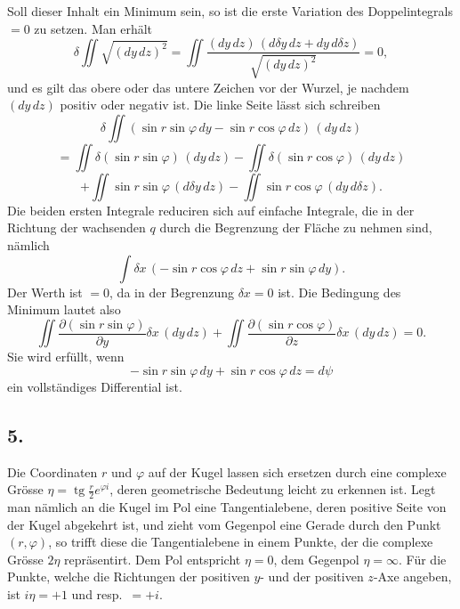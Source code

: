 \documentclass[12pt,a4paper]{article}
\DeclareMathOperator{\tg}{tg}
\begin{document}
Soll dieser Inhalt ein Minimum sein, so ist die erste Variation des Doppelintegrals $=0$ zu setzen. Man erh\"alt
\[\delta \iint \sqrt{(dy\, dz)^{2}} = \iint \frac{(dy\, dz)\, (d\delta y\, dz + dy\, d\delta z)}{\sqrt{(dy\, dz)^{2}}} = 0,\]
und es gilt das obere oder das untere Zeichen vor der Wurzel, je nachdem $(dy\, dz)$ positiv oder negativ ist. Die linke Seite l\"asst sich schreiben
\[\delta \iint (\sin r \sin\varphi\, dy - \sin r \cos\varphi\, dz)\, (dy\, dz)\]
\[= \iint \delta(\sin r \sin\varphi)\, (dy\, dz) - \iint \delta(\sin r \cos\varphi)\, (dy\, dz)\]
\[+ \iint \sin r \sin\varphi\, (d\delta y\, dz) - \iint \sin r \cos\varphi\, (dy\, d\delta z).\]
Die beiden ersten Integrale reduciren sich auf einfache Integrale, die in der Richtung der wachsenden $q$ durch die Begrenzung der Fl\"ache zu nehmen sind, n\"amlich
\[\int \delta x \, (-\sin r \cos\varphi\, dz + \sin r \sin\varphi\, dy).\]
Der Werth ist $=0$, da in der Begrenzung $\delta x = 0$ ist. Die Bedingung des Minimum lautet also
\[\iint \frac{\partial(\sin r \sin\varphi)}{\partial y} \delta x\, (dy\, dz) + \iint \frac{\partial(\sin r \cos\varphi)}{\partial z} \delta x\, (dy\, dz) = 0.\]
Sie wird erf\"ullt, wenn
\begin{equation}\tag{2}
-\sin r \sin\varphi\, dy + \sin r \cos\varphi\, dz = d\psi
\end{equation}
ein vollst\"andiges Differential ist.

\subsection*{5.}

Die Coordinaten $r$ und $\varphi$ auf der Kugel lassen sich ersetzen durch eine complexe Gr\"osse $\eta = \tg\frac{r}{2} e^{\varphi i}$, deren geometrische Bedeutung leicht zu erkennen ist. Legt man n\"amlich an die Kugel im Pol eine Tangentialebene, deren positive Seite von der Kugel abgekehrt ist, und zieht vom Gegenpol eine Gerade durch den Punkt $(r,\varphi)$, so trifft diese die Tangentialebene in einem Punkte, der die complexe Gr\"osse $2\eta$ repr\"asentirt. Dem Pol entspricht $\eta = 0$, dem Gegenpol $\eta = \infty$. F\"ur die Punkte, welche die Richtungen der positiven $y$- und der positiven $z$-Axe angeben, ist $i\eta = +1$ und resp.\ $=+i$.
\end{document}
